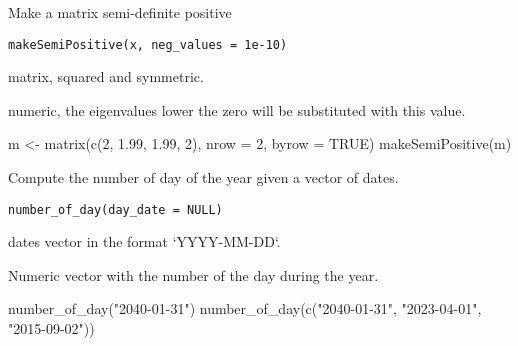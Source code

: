 \documentclass[a4paper]{book}
\begin{document}
%
\begin{Description}\relax
Make a matrix semi-definite positive
\end{Description}
%
\begin{Usage}
\begin{verbatim}
makeSemiPositive(x, neg_values = 1e-10)
\end{verbatim}
\end{Usage}
%
\begin{Arguments}
\begin{ldescription}
\item[\code{x}] matrix, squared and symmetric.

\item[\code{neg\_values}] numeric, the eigenvalues lower the zero will be substituted with this value.
\end{ldescription}
\end{Arguments}
%
\begin{Examples}
\begin{ExampleCode}
m <- matrix(c(2, 1.99, 1.99, 2), nrow = 2, byrow = TRUE)
makeSemiPositive(m)

\end{ExampleCode}
\end{Examples}
%
\begin{Description}\relax
Compute the number of day of the year given a vector of dates.
\end{Description}
%
\begin{Usage}
\begin{verbatim}
number_of_day(day_date = NULL)
\end{verbatim}
\end{Usage}
%
\begin{Arguments}
\begin{ldescription}
\item[\code{day\_date}] dates vector in the format `YYYY-MM-DD`.
\end{ldescription}
\end{Arguments}
%
\begin{Value}
Numeric vector with the number of the day during the year.
\end{Value}
%
\begin{Examples}
\begin{ExampleCode}
number_of_day("2040-01-31")
number_of_day(c("2040-01-31", "2023-04-01", "2015-09-02"))
\end{ExampleCode}
\end{Examples}
\end{document}

